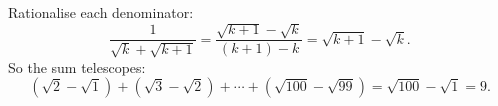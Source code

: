 Rationalise each denominator:
\[\dfrac{1}{\sqrt k+\sqrt{k+1}}=\dfrac{\sqrt{k+1}-\sqrt k}{(k+1)-k}=\sqrt{k+1}-\sqrt k.\]
So the sum telescopes:
\[\left(\sqrt2-\sqrt1\right)+\left(\sqrt3-\sqrt2\right)+\cdots+\left(\sqrt{100}-\sqrt{99}\right)=\sqrt{100}-\sqrt1=\boxed{9}.\]
